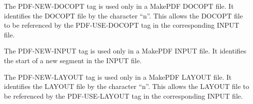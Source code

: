 \documentclass[letterpaper,10pt,english]{sphinxmanual}
\begin{document}
\begin{sphinxVerbatim}[commandchars=\\\{\}]
  
\end{sphinxVerbatim}

The PDF-NEW-DOCOPT tag is used only in a MakePDF DOCOPT file. It identifies the DOCOPT file by the character “n”. This allows the DOCOPT file to be referenced by the PDF-USE-DOCOPT tag in the corresponding INPUT file.


\begin{sphinxVerbatim}[commandchars=\\\{\}]
  
\end{sphinxVerbatim}

The PDF-NEW-INPUT tag is used only in a MakePDF INPUT file. It identifies the start of a new segment in the INPUT file.


\begin{sphinxVerbatim}[commandchars=\\\{\}]
  
\end{sphinxVerbatim}

The PDF-NEW-LAYOUT tag is used only in a MakePDF LAYOUT file. It identifies the LAYOUT file by the character “n”. This allows the LAYOUT file to be referenced by the PDF-USE-LAYOUT tag in the corresponding INPUT file.


\begin{sphinxVerbatim}[commandchars=\\\{\}]
  
\end{sphinxVerbatim}
\end{document}
